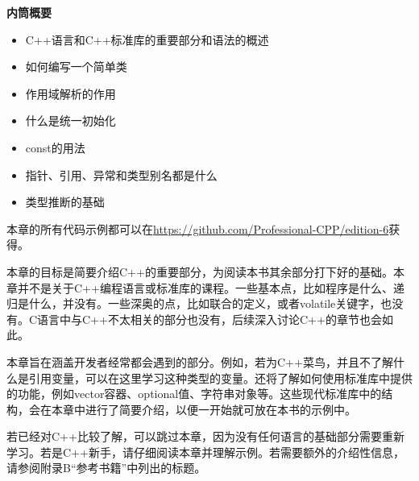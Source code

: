 
\noindent
\textbf{内筒概要}

\begin{itemize}
\item
C++语言和C++标准库的重要部分和语法的概述

\item
如何编写一个简单类

\item
作用域解析的作用

\item
什么是统一初始化

\item
const的用法

\item
指针、引用、异常和类型别名都是什么

\item
类型推断的基础
\end{itemize}

本章的所有代码示例都可以在\url{https://github.com/Professional-CPP/edition-6}获得。

本章的目标是简要介绍C++的重要部分，为阅读本书其余部分打下好的基础。本章并不是关于C++编程语言或标准库的课程。一些基本点，比如程序是什么、递归是什么，并没有。一些深奥的点，比如联合的定义，或者volatile关键字，也没有。C语言中与C++不太相关的部分也没有，后续深入讨论C++的章节也会如此。

本章旨在涵盖开发者经常都会遇到的部分。例如，若为C++菜鸟，并且不了解什么是引用变量，可以在这里学习这种类型的变量。还将了解如何使用标准库中提供的功能，例如vector容器、optional值、字符串对象等。这些现代标准库中的结构，会在本章中进行了简要介绍，以便一开始就可放在本书的示例中。

若已经对C++比较了解，可以跳过本章，因为没有任何语言的基础部分需要重新学习。若是C++新手，请仔细阅读本章并理解示例。若需要额外的介绍性信息，请参阅附录B“参考书籍”中列出的标题。








